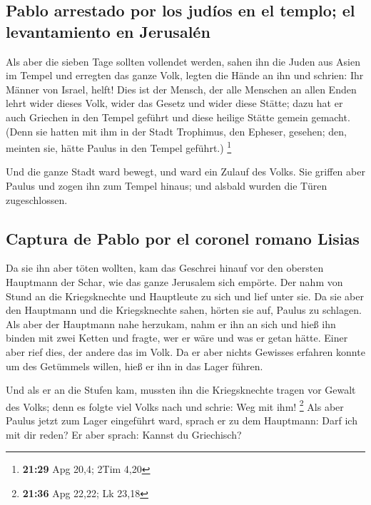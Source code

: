 \hypertarget{pablo-arrestado-por-los-juduxedos-en-el-templo-el-levantamiento-en-jerusaluxe9n}{%
\subsection{Pablo arrestado por los judíos en el templo; el
levantamiento en
Jerusalén}\label{pablo-arrestado-por-los-juduxedos-en-el-templo-el-levantamiento-en-jerusaluxe9n}}

 Als aber die sieben Tage sollten vollendet werden, sahen
ihn die Juden aus Asien im Tempel und erregten das ganze Volk, legten
die Hände an ihn und schrien:  Ihr Männer von Israel,
helft! Dies ist der Mensch, der alle Menschen an allen Enden lehrt wider
dieses Volk, wider das Gesetz und wider diese Stätte; dazu hat er auch
Griechen in den Tempel geführt und diese heilige Stätte gemein gemacht.
 (Denn sie hatten mit ihm in der Stadt Trophimus, den
Epheser, gesehen; den, meinten sie, hätte Paulus in den Tempel geführt.)
\footnote{\textbf{21:29} Apg 20,4; 2Tim 4,20}

 Und die ganze Stadt ward bewegt, und ward ein Zulauf des
Volks. Sie griffen aber Paulus und zogen ihn zum Tempel hinaus; und
alsbald wurden die Türen zugeschlossen.

\hypertarget{captura-de-pablo-por-el-coronel-romano-lisias}{%
\subsection{Captura de Pablo por el coronel romano
Lisias}\label{captura-de-pablo-por-el-coronel-romano-lisias}}

 Da sie ihn aber töten wollten, kam das Geschrei hinauf
vor den obersten Hauptmann der Schar, wie das ganze Jerusalem sich
empörte.  Der nahm von Stund an die Kriegsknechte und
Hauptleute zu sich und lief unter sie. Da sie aber den Hauptmann und die
Kriegsknechte sahen, hörten sie auf, Paulus zu schlagen. 
Als aber der Hauptmann nahe herzukam, nahm er ihn an sich und hieß ihn
binden mit zwei Ketten und fragte, wer er wäre und was er getan hätte.
 Einer aber rief dies, der andere das im Volk. Da er aber
nichts Gewisses erfahren konnte um des Getümmels willen, hieß er ihn in
das Lager führen.

 Und als er an die Stufen kam, mussten ihn die
Kriegsknechte tragen vor Gewalt des Volks;  denn es
folgte viel Volks nach und schrie: Weg mit ihm! \footnote{\textbf{21:36}
  Apg 22,22; Lk 23,18}  Als aber Paulus jetzt zum Lager
eingeführt ward, sprach er zu dem Hauptmann: Darf ich mit dir reden? Er
aber sprach: Kannst du Griechisch?

